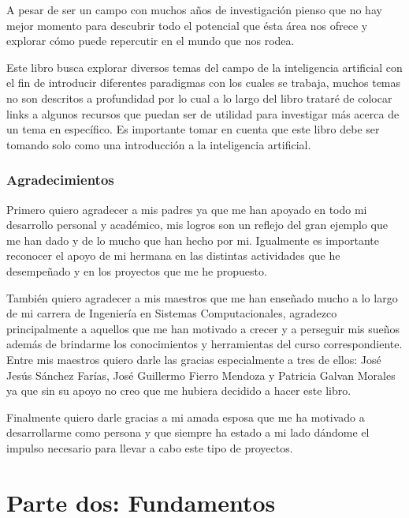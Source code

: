 \documentclass[11pt,fleqn]{book} %
\begin{document}
A pesar de ser un campo con muchos años de investigación pienso que no hay mejor momento para descubrir todo el potencial que ésta área nos ofrece y explorar cómo puede repercutir en el mundo que nos rodea.

Este libro busca explorar diversos temas del campo de la inteligencia artificial con el fin de introducir diferentes paradigmas con los cuales se trabaja, muchos temas no son descritos a profundidad por lo cual a lo largo del libro trataré de colocar links a algunos recursos que puedan ser de utilidad para investigar más acerca de un tema en específico. Es importante tomar en cuenta que este libro debe ser tomando solo como una introducción a la inteligencia artificial.


\section{Agradecimientos}

Primero quiero agradecer a mis padres ya que me han apoyado en todo mi desarrollo personal y académico, mis logros son un reflejo del gran ejemplo que me han dado y de lo mucho que han hecho por mi. Igualmente es importante reconocer el apoyo de mi hermana en las distintas actividades que he desempeñado y en los proyectos que me he propuesto.

También quiero agradecer a mis maestros que me han enseñado mucho a lo largo de mi carrera de Ingeniería en Sistemas Computacionales, agradezco principalmente a aquellos que me han motivado a crecer y a perseguir mis sueños además de brindarme los conocimientos y herramientas del curso correspondiente. Entre mis maestros quiero darle las gracias especialmente a tres de ellos: José Jesús Sánchez Farías, José Guillermo Fierro Mendoza y Patricia Galvan Morales ya que sin su apoyo no creo que me hubiera decidido a hacer este libro.

Finalmente quiero darle gracias a mi amada esposa que me ha motivado a desarrollarme como persona y que siempre ha estado a mi lado dándome el impulso necesario para llevar a cabo este tipo de proyectos. 


\part{Parte dos: Fundamentos}
\end{document}
